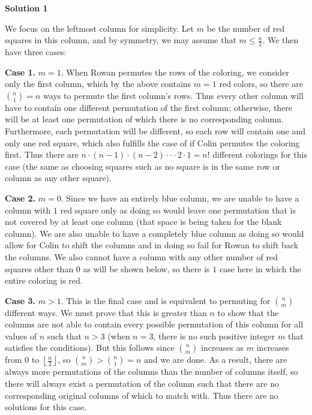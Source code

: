 \begin{enumerate}
 



\textbf{Solution 1}

We focus on the leftmost column for simplicity. Let $m$ be the number of red squares in this column, and by symmetry, we may assume that $m\le \frac{n}{2}$. We then have three cases:

 \textbf{Case 1.} $m=1$. When Rowan permutes the rows of the coloring, we consider only the first column, which by the above contains $m=1$ red colors, so there are ${n \choose 1}=n$ ways to permute the first column’s rows. Thus every other column will have to contain one different permutation of the first column; otherwise, there will be at least one permutation of which there is no corresponding column. Furthermore, each permutation will be different, so each row will contain one and only one red square, which also fulfills the case of if Colin permutes the coloring first. Thus there are $n\cdot (n-1)\cdot(n-2)\cdot\cdot\cdot2\cdot1=n!$ different colorings for this case (the same as choosing squares such as no square is in the same row or column as any other square).

 \textbf{Case 2.} $m=0$. Since we have an entirely blue column, we are unable to have a column with $1$ red square only as doing so would leave one permutation that is not covered by at least one column (that space is being taken for the blank column). We are also unable to have a completely blue column as doing so would allow for Colin to shift the columns and in doing so fail for Rowan to shift back the columns. We also cannot have a column with any other number of red squares other than $0$ as will be shown below, so there is $1$ case here in which the entire coloring is red.

 \textbf{Case 3.} $m>1$. This is the final case and is equivalent to permuting for ${n \choose m}$ different ways. We must prove that this is greater than $n$ to show that the columns are not able to contain every possible permutation of this column for all values of $n$ such that $n>3$ (when $n=3$, there is no such positive integer $m$ that satisfies the conditions). But this follows since $\binom{n}{m}$ increases as $m$ increases from $0$ to $\left\lfloor \frac{n}{2}\right\rfloor$, so $\binom{n}{m}>\binom{n}{1}=n$ and we are done. As a result, there are always more permutations of the columns than the number of columns itself, so there will always exist a permutation of the column such that there are no corresponding original columns of which to match with. Thus there are no solutions for this case.


\end{enumerate}

